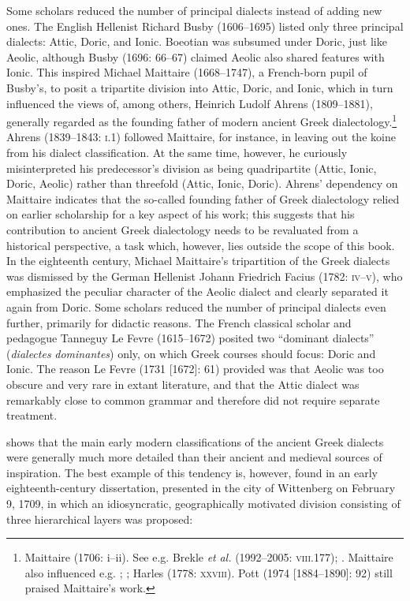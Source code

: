 Some scholars reduced the number of principal dialects instead of adding new ones. The English Hellenist Richard Busby (1606–1695) listed only three principal dialects: Attic, Doric, and Ionic. Boeotian was subsumed under Doric, just like Aeolic, although Busby (1696: 66–67) claimed Aeolic also shared features with Ionic. This inspired Michael Maittaire (1668–1747), a French-born pupil of Busby’s, to posit a tripartite division into Attic, Doric, and Ionic, which in turn influenced the views of, among others, Heinrich Ludolf Ahrens (1809–1881), generally regarded as the founding father of modern ancient Greek dialectology.\footnote{Maittaire (1706: i–ii). See e.g. Brekle \textit{et} \textit{al.} (1992–2005: \textsc{viii}.177); \citet[463]{Finkelberg2014}. Maittaire also influenced e.g. \citet[213]{Thompson1732}; \citet[162]{Gesner1774}; Harles (1778: \textsc{xxviii}). Pott (1974 [1884–1890]: 92) still praised Maittaire’s work.} Ahrens (1839–1843: \textsc{i.}1) followed Maittaire, for instance, in leaving out the koine from his dialect classification. At the same time, however, he curiously misinterpreted his predecessor’s division as being quadripartite (Attic, Ionic, Doric, Aeolic) rather than threefold (Attic, Ionic, Doric). Ahrens’ dependency on Maittaire indicates that the so-called founding father of Greek dialectology relied on earlier scholarship for a key aspect of his work; this suggests that his contribution to ancient Greek dialectology needs to be revaluated from a historical perspective, a task which, however, lies outside the scope of this book. In the eighteenth century, Michael Maittaire’s tripartition of the Greek dialects was dismissed by the German Hellenist Johann Friedrich Facius (1782: \textsc{iv–v}), who emphasized the peculiar character of the Aeolic dialect and clearly separated it again from Doric. Some scholars reduced the number of principal dialects even further, primarily for didactic reasons. The French classical scholar and pedagogue Tanneguy Le Fevre (1615–1672) posited two “dominant dialects” (\textit{dialectes} \textit{dominantes}) only, on which Greek courses should focus: Doric and Ionic. The reason Le Fevre (1731 [1672]: 61) provided was that Aeolic was too obscure and very rare in extant literature, and that the Attic dialect was remarkably close to common grammar and therefore did not require separate treatment.

 shows that the main early modern classifications of the ancient Greek dialects were generally much more detailed than their ancient and medieval sources of inspiration. The best example of this tendency is, however, found in an early eighteenth-century dissertation, presented in the city of Wittenberg on February 9, 1709, in which an idiosyncratic, geographically motivated division consisting of three hierarchical layers was proposed:

